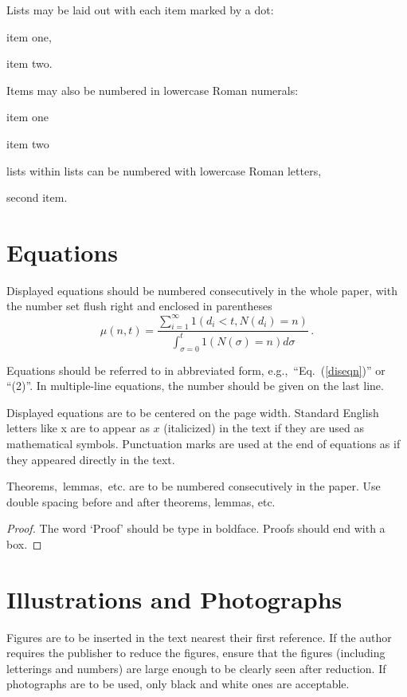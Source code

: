 \documentclass{ws-ijmpc}
\begin{document}
Lists may be laid out with each item marked by a dot:
\begin{itemlist}
 \item item one,
 \item item two.
\end{itemlist}
Items may also be numbered in lowercase Roman numerals:
\begin{romanlist}[(ii)]
\item item one
\item item two
	\begin{romanlist}[(b)]
	\item lists within lists can be numbered with lowercase
              Roman letters,
	\item second item.
	\end{romanlist}
\end{romanlist}

\section{Equations}

Displayed equations should be numbered consecutively in the whole
paper, with the number set flush right and enclosed in
parentheses
\begin{equation}
\mu(n, t) = \frac{\sum^\infty_{i=1} 1(d_i < t, N(d_i)
= n)}{\int^t_{\sigma=0} 1(N(\sigma) = n)d\sigma}\,.
\label{diseqn}
\end{equation}

Equations should be referred to in abbreviated form,
e.g.,~``Eq.~(\ref{diseqn})'' or ``(2)''. In multiple-line
equations, the number should be given on the last line.

Displayed equations are to be centered on the page width.
Standard English letters like x are to appear as $x$
(italicized) in the text if they are used as mathematical
symbols. Punctuation marks are used at the end of equations as
if they appeared directly in the text.

\begin{theorem}
Theorems$,$ lemmas$,$ etc. are to be numbered
consecutively in the paper. Use double spacing before and after
theorems, lemmas, etc.
\end{theorem}

\begin{proof}
The word `Proof' should be type in boldface. Proofs
should end with\break
a box.
\end{proof}

\section{Illustrations and Photographs}
Figures are to be inserted in the text nearest their first
reference. If the author requires the publisher to reduce the figures,
ensure that the figures (including letterings and numbers) are large
enough to be clearly seen after reduction. If photographs are to be
used, only black and white ones are acceptable.
\end{document}
